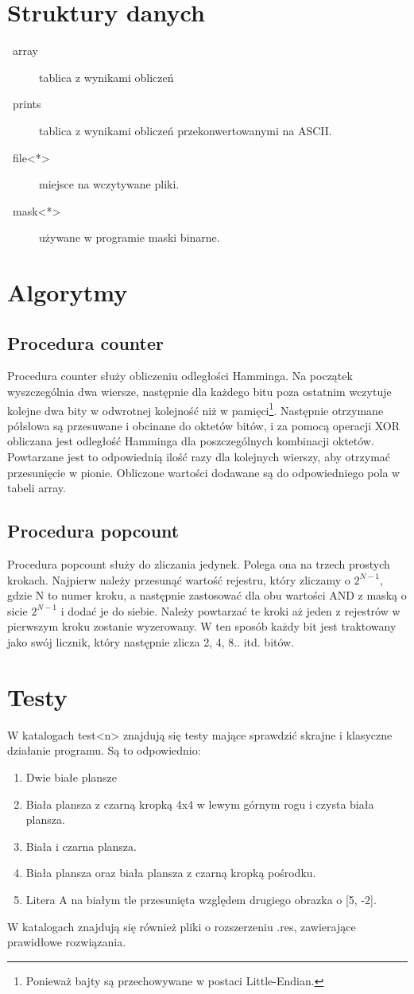 \documentclass{article}
\newcommand\bitem[1]{\item[\textbullet~#1]}
\begin{document}
\section{Struktury danych}
\begin{description}
 \bitem{array} tablica z wynikami obliczeń
 \bitem{prints} tablica z wynikami obliczeń przekonwertowanymi na ASCII.
 \bitem{file<*>} miejsce na wczytywane pliki.
 \bitem{mask<*>} używane w programie maski binarne.
\end{description}

\section{Algorytmy}
\subsection{Procedura counter}
Procedura counter służy obliczeniu odległości Hamminga. Na początek wyszczególnia dwa wiersze, następnie dla każdego bitu poza ostatnim  
wczytuje kolejne dwa bity w odwrotnej kolejność niż w pamięci\footnote{Ponieważ bajty są przechowywane w postaci Little-Endian.}.
Następnie otrzymane półsłowa są przesuwane i obcinane do oktetów bitów, i za pomocą operacji XOR obliczana jest odległość Hamminga dla
poszczególnych kombinacji oktetów. Powtarzane jest to odpowiednią ilość razy dla kolejnych wierszy, aby otrzymać przesunięcie w pionie.
Obliczone wartości dodawane są do odpowiedniego pola w tabeli array.
\subsection{Procedura popcount}
Procedura popcount służy do zliczania jedynek. Polega ona na trzech prostych krokach. Najpierw należy przesunąć wartość rejestru, który 
zliczamy o $2^{N-1}$, gdzie N to numer kroku, a następnie zastosować dla obu wartości AND z maską o sicie $2^{N-1}$ i dodać je do siebie.
Należy powtarzać te kroki aż jeden z rejestrów w pierwszym kroku zostanie wyzerowany.
W ten sposób każdy bit jest traktowany jako swój licznik, który następnie zlicza 2, 4, 8.. itd. bitów.
\section{Testy}
W katalogach test<n> znajdują się testy mające sprawdzić skrajne i klasyczne działanie programu. Są to odpowiednio:
\begin{enumerate}
 \item Dwie białe plansze
 \item Biała plansza z czarną kropką 4x4 w lewym górnym rogu i czysta biała plansza.
 \item Biała i czarna plansza.
 \item Biała plansza oraz biała plansza z czarną kropką pośrodku.
 \item Litera A na białym tle przesunięta względem drugiego obrazka o [5, -2].
\end{enumerate}
W katalogach znajdują się również pliki o rozszerzeniu .res, zawierające prawidłowe rozwiązania.
\end{document}
